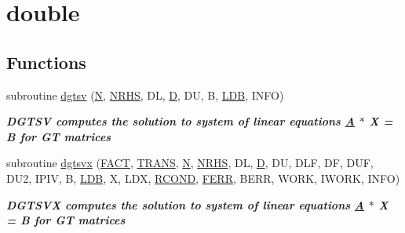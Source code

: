 \hypertarget{group__doubleGTsolve}{}\section{double}
\label{group__doubleGTsolve}
\subsection*{Functions}
\begin{DoxyCompactItemize}
\item 
subroutine \hyperlink{group__doubleGTsolve_ga2bf93f2ddefa5e671866eb2191dc19d4}{dgtsv} (\hyperlink{polmisc_8c_a0240ac851181b84ac374872dc5434ee4}{N}, \hyperlink{example__user_8c_aa0138da002ce2a90360df2f521eb3198}{N\+R\+H\+S}, D\+L, \hyperlink{odrpack_8h_a7dae6ea403d00f3687f24a874e67d139}{D}, D\+U, B, \hyperlink{example__user_8c_a50e90a7104df172b5a89a06c47fcca04}{L\+D\+B}, I\+N\+F\+O)
\begin{DoxyCompactList}\small\item\em {\bfseries  D\+G\+T\+S\+V computes the solution to system of linear equations \hyperlink{classA}{A} $\ast$ X = B for G\+T matrices {\bfseries  }}\end{DoxyCompactList}\item 
subroutine \hyperlink{group__doubleGTsolve_gaa9e938f737eedf395c4429393c769d07}{dgtsvx} (\hyperlink{superlu__enum__consts_8h_af00a42ecad444bbda75cde1b64bd7e72a1b6692b56d378abb85bd49063721d034}{F\+A\+C\+T}, \hyperlink{superlu__enum__consts_8h_a0c4e17b2d5cea33f9991ccc6a6678d62a1f61e3015bfe0f0c2c3fda4c5a0cdf58}{T\+R\+A\+N\+S}, \hyperlink{polmisc_8c_a0240ac851181b84ac374872dc5434ee4}{N}, \hyperlink{example__user_8c_aa0138da002ce2a90360df2f521eb3198}{N\+R\+H\+S}, D\+L, \hyperlink{odrpack_8h_a7dae6ea403d00f3687f24a874e67d139}{D}, D\+U, D\+L\+F, D\+F, D\+U\+F, D\+U2, I\+P\+I\+V, B, \hyperlink{example__user_8c_a50e90a7104df172b5a89a06c47fcca04}{L\+D\+B}, X, L\+D\+X, \hyperlink{superlu__enum__consts_8h_af00a42ecad444bbda75cde1b64bd7e72a9b5c151728d8512307565994c89919d5}{R\+C\+O\+N\+D}, \hyperlink{superlu__enum__consts_8h_af00a42ecad444bbda75cde1b64bd7e72a78fd14d7abebae04095cfbe02928f153}{F\+E\+R\+R}, B\+E\+R\+R, W\+O\+R\+K, I\+W\+O\+R\+K, I\+N\+F\+O)
\begin{DoxyCompactList}\small\item\em {\bfseries  D\+G\+T\+S\+V\+X computes the solution to system of linear equations \hyperlink{classA}{A} $\ast$ X = B for G\+T matrices {\bfseries  }}\end{DoxyCompactList}\end{DoxyCompactItemize}



